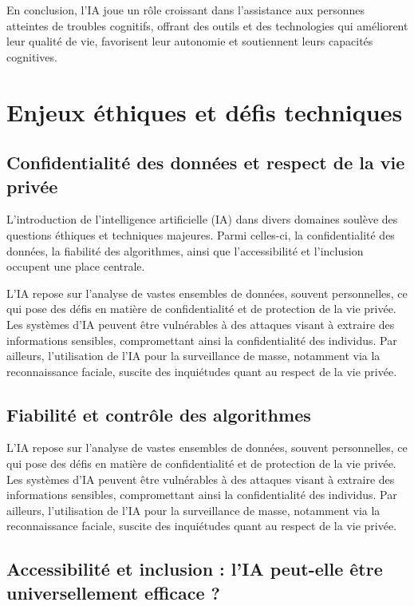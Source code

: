 \documentclass[12pt,a4paper]{report}
\begin{document}
En conclusion, l'IA joue un rôle croissant dans l'assistance aux personnes atteintes de troubles cognitifs, offrant des outils et des technologies qui améliorent leur qualité de vie, favorisent leur autonomie et soutiennent leurs capacités cognitives.

\section{Enjeux éthiques et défis techniques}

\subsection{Confidentialité des données et respect de la vie privée}

L'introduction de l'intelligence artificielle (IA) dans divers domaines soulève des questions éthiques et techniques majeures. Parmi celles-ci, la confidentialité des données, la fiabilité des algorithmes, ainsi que l'accessibilité et l'inclusion occupent une place centrale.

L'IA repose sur l'analyse de vastes ensembles de données, souvent personnelles, ce qui pose des défis en matière de confidentialité et de protection de la vie privée. Les systèmes d'IA peuvent être vulnérables à des attaques visant à extraire des informations sensibles, compromettant ainsi la confidentialité des individus. Par ailleurs, l'utilisation de l'IA pour la surveillance de masse, notamment via la reconnaissance faciale, suscite des inquiétudes quant au respect de la vie privée.

\subsection{Fiabilité et contrôle des algorithmes}

L'IA repose sur l'analyse de vastes ensembles de données, souvent personnelles, ce qui pose des défis en matière de confidentialité et de protection de la vie privée. Les systèmes d'IA peuvent être vulnérables à des attaques visant à extraire des informations sensibles, compromettant ainsi la confidentialité des individus. Par ailleurs, l'utilisation de l'IA pour la surveillance de masse, notamment via la reconnaissance faciale, suscite des inquiétudes quant au respect de la vie privée.

\subsection{Accessibilité et inclusion : l'IA peut-elle être universellement efficace ?}
\end{document}
